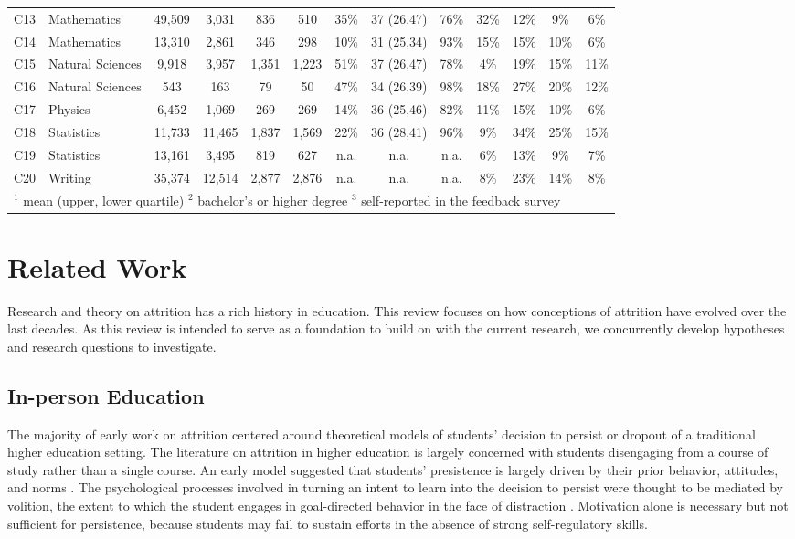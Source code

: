 \documentclass{sigchi}\usepackage[]{graphicx}\usepackage[]{color}
\begin{document}
\begin{table}[th]
\begin{tabular}{llccccccccccc}
C13 & Mathematics & 49,509 & 3,031 & 836 & 510 & 35\% & 37 (26,47) & 76\% & 32\% & 12\% & 9\% & 6\%\\
C14 & Mathematics & 13,310 & 2,861 & 346 & 298 & 10\% & 31 (25,34) & 93\% & 15\% & 15\% & 10\% & 6\%\\
C15 & Natural Sciences & 9,918 & 3,957 & 1,351 & 1,223 & 51\% & 37 (26,47) & 78\% & 4\% & 19\% & 15\% & 11\%\\
C16 & Natural Sciences & 543 & 163 & 79 & 50 & 47\% & 34 (26,39) & 98\% & 18\% & 27\% & 20\% & 12\%\\
C17 & Physics & 6,452 & 1,069 & 269 & 269 & 14\% & 36 (25,46) & 82\% & 11\% & 15\% & 10\% & 6\%\\
C18 & Statistics & 11,733 & 11,465 & 1,837 & 1,569 & 22\% & 36 (28,41) & 96\% & 9\% & 34\% & 25\% & 15\%\\
C19 & Statistics & 13,161 & 3,495 & 819 & 627 & n.a. & n.a. & n.a. & 6\% & 13\% & 9\% & 7\%\\
C20 & Writing & 35,374 & 12,514 & 2,877 & 2,876 & n.a. & n.a. & n.a. & 8\% & 23\% & 14\% & 8\%\\
\bottomrule
\multicolumn{13}{l}{$^1$ mean (upper, lower quartile)  $^2$ bachelor's or higher degree  $^3$ self-reported in the feedback survey}
\end{tabular}
\end{table}


\section{Related Work}

Research and theory on attrition has a rich history in education. This review focuses on how conceptions of attrition have evolved over the last decades.  As this review is intended to serve as a foundation to build on with the current research, we concurrently develop hypotheses and research questions to investigate.

\subsection{In-person Education}

The majority of early work on attrition centered around theoretical models of students' decision to persist or dropout of a traditional higher education setting. The literature on attrition in higher education is largely concerned with students disengaging from a course of study rather than a single course. An early model suggested that students' presistence is largely driven by their prior behavior, attitudes, and norms \cite{fishbein1975belief}. The psychological processes involved in turning an intent to learn into the decision to persist were thought to be mediated by volition, the extent to which the student engages in goal-directed behavior in the face of distraction \cite{corno1993role}. Motivation alone is necessary but not sufficient for persistence, because students may fail to sustain efforts in the absence of strong self-regulatory skills.
\end{document}

